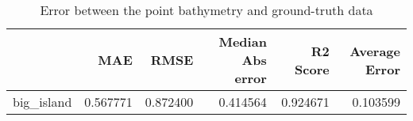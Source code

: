\begin{table}[h!]
\caption{Error between the point bathymetry and ground-truth data}
\label{tab:big_island_lidar_error}
\begin{tabular}{lrrrrr}
\toprule
 & MAE & RMSE & Median Abs error & R2 Score & Average Error \\
\midrule
big_island & 0.567771 & 0.872400 & 0.414564 & 0.924671 & 0.103599 \\
\bottomrule
\end{tabular}
\end{table}
